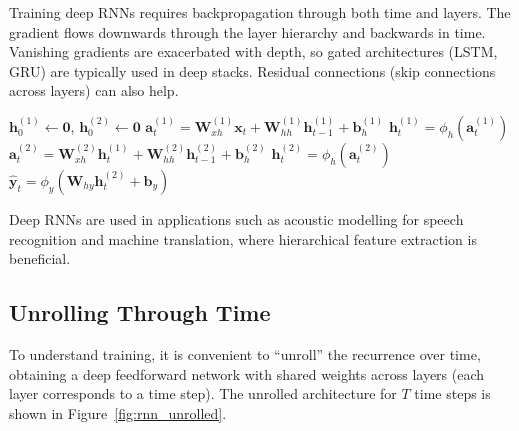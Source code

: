\documentclass{tufte-handout}
\begin{document}
Training deep RNNs requires backpropagation through both time and layers. The gradient flows downwards through the layer hierarchy and backwards in time. Vanishing gradients are exacerbated with depth, so gated architectures (LSTM, GRU) are typically used in deep stacks. Residual connections (skip connections across layers) can also help.

\begin{algorithm}[h]
    \caption{Forward pass for a stacked RNN (2 layers)}
    \begin{algorithmic}[1]
        \State $\mathbf{h}_0^{(1)} \gets \mathbf{0}$, $\mathbf{h}_0^{(2)} \gets \mathbf{0}$
            \State $\mathbf{a}_t^{(1)} = \mathbf{W}_{xh}^{(1)}\mathbf{x}_t + \mathbf{W}_{hh}^{(1)}\mathbf{h}_{t-1}^{(1)} + \mathbf{b}_h^{(1)}$
            \State $\mathbf{h}_t^{(1)} = \phi_h(\mathbf{a}_t^{(1)})$
            \State $\mathbf{a}_t^{(2)} = \mathbf{W}_{xh}^{(2)}\mathbf{h}_t^{(1)} + \mathbf{W}_{hh}^{(2)}\mathbf{h}_{t-1}^{(2)} + \mathbf{b}_h^{(2)}$
            \State $\mathbf{h}_t^{(2)} = \phi_h(\mathbf{a}_t^{(2)})$
            \State $\hat{\mathbf{y}}_t = \phi_y(\mathbf{W}_{hy}\mathbf{h}_t^{(2)} + \mathbf{b}_y)$
        \EndFor
    \end{algorithmic}
\end{algorithm}

Deep RNNs are used in applications such as acoustic modelling for speech recognition and machine translation, where hierarchical feature extraction is beneficial.

\subsection{Unrolling Through Time}

To understand training, it is convenient to “unroll” the recurrence over time, obtaining a deep feedforward network with shared weights across layers (each layer corresponds to a time step). The unrolled architecture for $T$ time steps is shown in Figure~\ref{fig:rnn_unrolled}.
\end{document}
